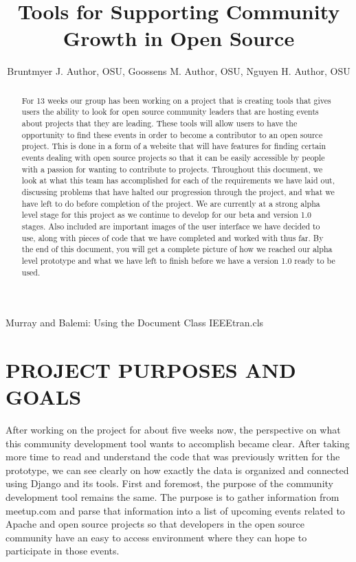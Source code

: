 \documentclass[letterpaper,10pt,onecolumn]{IEEEtran} %
\begin{document}
\title{Tools for Supporting Community Growth in Open Source } %

\author{Bruntmyer J. Author, OSU, Goossens M. Author, OSU, Nguyen H. Author, OSU}

{Murray and Balemi: Using the Document Class IEEEtran.cls} %


\maketitle

\begin{abstract}
For 13 weeks our group has been working on a project that is creating tools that gives users the ability to look for open source community leaders that are hosting events about projects that they are leading. These tools will allow users to have the opportunity to find these events in order to become a contributor to an open source project. This is done in a form of a website that will have features for finding certain events dealing with open source projects so that it can be easily accessible by people with a passion for wanting to contribute to projects. Throughout this document, we look at what this team has accomplished for each of the requirements we have laid out, discussing problems that have halted our progression through the project, and what we have left to do before completion of the project. We are currently at a strong alpha level stage for this project as we continue to develop for our beta and version 1.0 stages. Also included are important images of the user interface we have decided to use, along with pieces of code that we have completed and worked with thus far. By the end of this document, you will get a complete picture of how we reached our alpha level prototype and what we have left to finish before we have a version 1.0 ready to be used.
\end{abstract}

\newpage

\section{PROJECT PURPOSES AND GOALS}
After working on the project for about five weeks now, the perspective on what this community development tool wants to accomplish became clear. After taking more time to read and understand the code that was previously written for the prototype, we can see clearly on how exactly the data is organized and connected using Django and its tools. First and foremost, the purpose of the community development tool remains the same. The purpose is to gather information from meetup.com and parse that information into a list of upcoming events related to Apache and open source projects so that developers in the open source community have an easy to access environment where they can hope to participate in those events.
\end{document}
